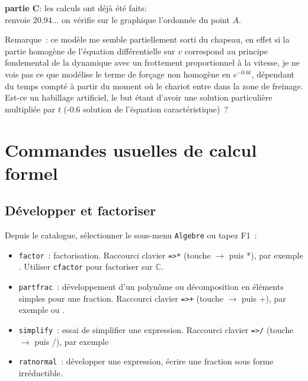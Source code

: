 \documentclass{article}
\newcommand{\C}{{\mathbb{C}}}
\newcommand{\C}{{\mathbb{C}}}
\begin{document}
\begin{giacjshere}
{\bf partie C}: les calculs ont déjà été faits:\\
 renvoie 20.94...
on vérifie sur le graphique l'ordonnée du point $A$.

Remarque~: ce modèle me semble partiellement sorti du chapeau, en effet 
si la partie homogène de l'équation différentielle sur $v$ 
correspond au principe fondemental de la dynamique avec
un frottement proportionnel à la vitesse, je ne vois
pas ce que modélise le terme de forçage
non homogène en $e^{-0.6t}$, dépendant du temps compté à partir du moment
où le chariot entre dans la zone de freinage. 
Est-ce un habillage artificiel, le but étant d'avoir une solution particulière
multipliée par $t$ (-0.6 solution de l'équation caractéristique)~?


\section{Commandes usuelles de calcul formel}
\subsection{D\'evelopper et factoriser}
Depuis le catalogue, s\'electionner le sous-menu \verb|Algebre|
ou tapez F1~:
\begin{itemize}
\item \verb|factor|~: factorisation. Raccourci clavier \verb|=>*|
(touche $\rightarrow$ puis *),
par exemple .
Utiliser \verb|cfactor| pour factoriser sur $\C$.
\item \verb|partfrac|~: d\'eveloppement d'un polyn\^ome ou
d\'ecomposition en \'el\'ements simples pour une fraction. Raccourci
clavier \verb|=>+| (touche $\rightarrow$ puis +), 
par exemple  
ou .
\item \verb|simplify|~: essai de simplifier une expression.
Raccourci clavier \verb|=>/| (touche $\rightarrow$ puis /), 
par exemple 
\item \verb|ratnormal|~: d\'evelopper une expression,
\'ecrire une fraction sous forme irr\'eductible.
\end{itemize}


\end{giacjshere}
\end{document}

